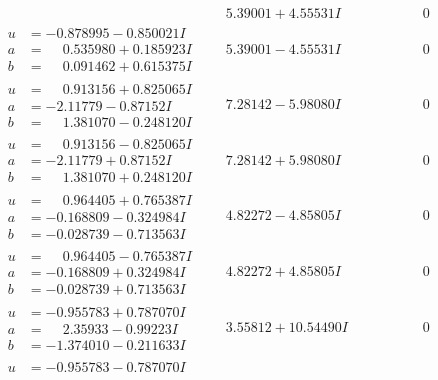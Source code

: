 \documentclass[1p]{elsarticle_modified}
\theoremstyle{definition}
\begin{document}
$$\begin{array}{c|c|c}
 & \phantom{-}5.39001 + 4.55531 I & \phantom{-0.000000 } 0 \\ \hline\begin{aligned}
u &= -0.878995 - 0.850021 I \\
a &= \phantom{-}0.535980 + 0.185923 I \\
b &= \phantom{-}0.091462 + 0.615375 I\end{aligned}
 & \phantom{-}5.39001 - 4.55531 I & \phantom{-0.000000 } 0 \\ \hline\begin{aligned}
u &= \phantom{-}0.913156 + 0.825065 I \\
a &= -2.11779 - 0.87152 I \\
b &= \phantom{-}1.381070 - 0.248120 I\end{aligned}
 & \phantom{-}7.28142 - 5.98080 I & \phantom{-0.000000 } 0 \\ \hline\begin{aligned}
u &= \phantom{-}0.913156 - 0.825065 I \\
a &= -2.11779 + 0.87152 I \\
b &= \phantom{-}1.381070 + 0.248120 I\end{aligned}
 & \phantom{-}7.28142 + 5.98080 I & \phantom{-0.000000 } 0 \\ \hline\begin{aligned}
u &= \phantom{-}0.964405 + 0.765387 I \\
a &= -0.168809 - 0.324984 I \\
b &= -0.028739 - 0.713563 I\end{aligned}
 & \phantom{-}4.82272 - 4.85805 I & \phantom{-0.000000 } 0 \\ \hline\begin{aligned}
u &= \phantom{-}0.964405 - 0.765387 I \\
a &= -0.168809 + 0.324984 I \\
b &= -0.028739 + 0.713563 I\end{aligned}
 & \phantom{-}4.82272 + 4.85805 I & \phantom{-0.000000 } 0 \\ \hline\begin{aligned}
u &= -0.955783 + 0.787070 I \\
a &= \phantom{-}2.35933 - 0.99223 I \\
b &= -1.374010 - 0.211633 I\end{aligned}
 & \phantom{-}3.55812 + 10.54490 I & \phantom{-0.000000 } 0 \\ \hline\begin{aligned}
u &= -0.955783 - 0.787070 I \\

\end{aligned}
\end{array}$$
\end{document}
